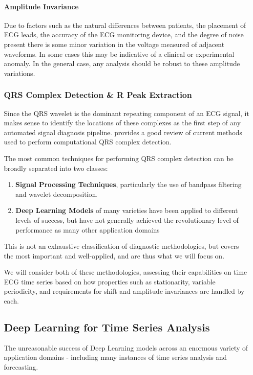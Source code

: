 \documentclass[9pt,conference]{IEEEtran}
\begin{document}
\paragraph{Amplitude Invariance}
Due to factors such as the natural differences between patients, the placement of ECG leads, the accuracy of the ECG monitoring device, and the degree of noise present there is some minor variation in the voltage measured of adjacent waveforms. In some cases this may be indicative of a clinical or experimental anomaly. In the general case, any analysis should be robust to these amplitude variations.

\subsubsection{QRS Complex Detection \& R Peak Extraction}

Since the QRS wavelet is the dominant repeating component of an ECG signal, it makes sense to identify the locations of these complexes as the first step of any automated signal diagnosis pipeline. \cite{ecgReview} provides a good review of current methods used to perform computational QRS complex detection.

The most common techniques for performing QRS complex detection can be broadly separated into two classes:

\begin{enumerate}
    \item \textbf{Signal Processing Techniques}, particularly the use of bandpass filtering and wavelet decomposition.
    \item \textbf{Deep Learning Models} of many varieties have been applied to different levels of success, but have not generally achieved the revolutionary level of performance as many other application domains
\end{enumerate}

This is not an exhaustive classification of diagnostic methodologies, but covers the most important and well-applied, and are thus what we will focus on.

We will consider both of these methodologies, assessing their capabilities on time ECG time series based on how properties such as stationarity, variable periodicity, and requirements for shift and amplitude invariances are handled by each.

\subsection{Deep Learning for Time Series Analysis}
The unreasonable success of Deep Learning models across an enormous variety of application domains - including many instances of time series analysis and forecasting.
\end{document}
